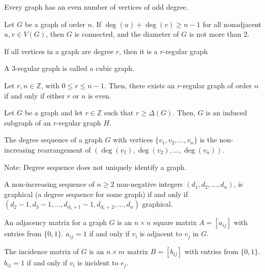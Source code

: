 \documentclass{article}
\begin{document}
\medskip{}

    Every graph has an even number of vertices of odd degree.

\medskip{}

    Let $G$ be a graph of order $n$. If $\deg(u) + \deg(v) \geq n-1$ for all nonadjacent $u,v \in V(G)$, then $G$ is connected, and the diameter of $G$ is not more than 2.

\medskip\noindent{\bf }

\medskip{}

    If all vertices in a graph are degree $r$, then it is a $r$-regular graph

\medskip{}

    A 3-regular graph is called a cubic graph.

\medskip{}

    Let $r, n \in \mathbb Z$, with $0 \leq r \leq n-1$. Then, there exists an $r$-regular graph of order $n$ if and only if either $r$ or $n$ is even.

\medskip{}

    Let $G$ be a graph and let $r \in \mathbb Z$ such that $r \geq \Delta(G)$. Then, $G$ is an induced subgraph of an $r$-regular graph $H$.

\medskip{}

    The degree sequence of a graph $G$ with vertices $\{v_1, v_2, \hdots, v_n\}$ is the non-increasing rearrangement of $(\deg(v_1), \deg(v_2), \hdots, \deg(v_n))$.

    Note: Degree sequence does not uniquely identify a graph.

\medskip{}

    A non-increasing sequence of $n \geq 2$ non-negative integers $(d_1, d_2, \hdots, d_n)$, is graphical (a degree sequence for some graph) if and only if $(d_2-1, d_3-1, \hdots, d_{d_1+1}-1, d_{d_1+2}, \hdots, d_n)$ graphical.

\medskip{}

    An adjacency matrix for a graph $G$ is an $n \times n$ square matrix $A = [a_{ij}]$ with entries from $\{0, 1\}$.
    $a_{ij} = 1$ if and only if $v_i$ is adjacent to $v_j$ in $G$.

\medskip{}

    The incidence matrix of $G$ is an $n \times m$ matrix $B = [b_{ij}]$ with entries from $\{0,1\}$.
    $b_{ij} = 1$ if and only if $v_i$ is incident to $e_j$.
\end{document}
